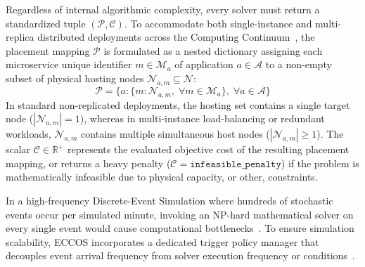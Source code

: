 \documentclass[ASNA]{USG} %
\begin{document}
Regardless of internal algorithmic complexity, every solver must return a standardized tuple $(\mathcal{P}, \mathcal{C})$. To accommodate both single-instance and multi-replica distributed deployments across the Computing Continuum~\cite{Santos2021Service}, the placement mapping $\mathcal{P}$ is formulated as a nested dictionary assigning each microservice unique identifier $m \in \mathcal{M}_a$ of application $a \in \mathcal{A}$ to a non-empty subset of physical hosting nodes $\mathcal{N}_{a,m} \subseteq \mathcal{N}$:
\begin{equation}
\mathcal{P} = \Big\{ a: \big\{ m: \mathcal{N}_{a,m}, \; \forall m \in \mathcal{M}_a \big\}, \; \forall a \in \mathcal{A} \Big\}
\end{equation}
In standard non-replicated deployments, the hosting set contains a single target node ($|\mathcal{N}_{a,m}| = 1$), whereas in multi-instance load-balancing or redundant workloads, $\mathcal{N}_{a,m}$ contains multiple simultaneous host nodes ($|\mathcal{N}_{a,m}| \geq 1$). The scalar $\mathcal{C} \in \mathbb{R}^+$ represents the evaluated objective cost of the resulting placement mapping, or returns a heavy penalty ($\mathcal{C} = \texttt{infeasible\_penalty}$) if the problem is mathematically infeasible due to physical capacity, or other, constraints.


In a high-frequency Discrete-Event Simulation where hundreds of stochastic events occur per simulated minute, invoking an NP-hard mathematical solver on every single event would cause computational bottlenecks~\cite{He2024An}. To ensure simulation scalability, \textsc{ECCOS} incorporates a dedicated trigger policy manager that decouples event arrival frequency from solver execution frequency or conditions~\cite{Peng2022Distributed}.
\end{document}
